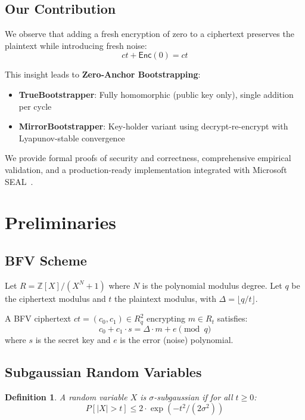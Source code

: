 \documentclass[11pt,a4paper]{article}
\newtheorem{definition}[theorem]{Definition}
\begin{document}
\subsection{Our Contribution}

We observe that adding a fresh encryption of zero to a ciphertext preserves the plaintext while introducing fresh noise:
\[
ct + \mathsf{Enc}(0) = ct
\]

This insight leads to \textbf{Zero-Anchor Bootstrapping}:
\begin{itemize}
    \item \textbf{TrueBootstrapper}: Fully homomorphic (public key only), single addition per cycle
    \item \textbf{MirrorBootstrapper}: Key-holder variant using decrypt-re-encrypt with Lyapunov-stable convergence
\end{itemize}

We provide formal proofs of security and correctness, comprehensive empirical validation, and a production-ready implementation integrated with Microsoft SEAL~\cite{seal}.

\section{Preliminaries}

\subsection{BFV Scheme}

Let $R = \mathbb{Z}[X]/(X^N + 1)$ where $N$ is the polynomial modulus degree. Let $q$ be the ciphertext modulus and $t$ the plaintext modulus, with $\Delta = \lfloor q/t \rfloor$.

A BFV ciphertext $ct = (c_0, c_1) \in R_q^2$ encrypting $m \in R_t$ satisfies:
\begin{equation}
c_0 + c_1 \cdot s = \Delta \cdot m + e \pmod{q}
\end{equation}
where $s$ is the secret key and $e$ is the error (noise) polynomial.

\subsection{Subgaussian Random Variables}

\begin{definition}
A random variable $X$ is $\sigma$-subgaussian if for all $t \geq 0$:
\[
P[|X| > t] \leq 2 \cdot \exp(-t^2 / (2\sigma^2))
\]
\end{definition}
\end{document}
